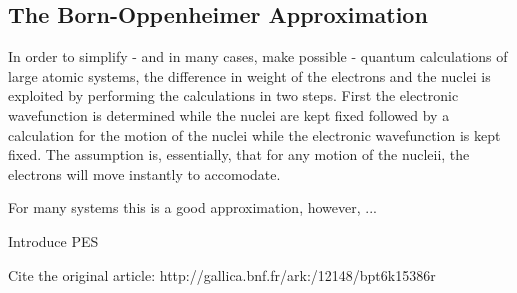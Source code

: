 \subsection{The Born-Oppenheimer Approximation}
\label{sec:born-oppenheimer}

In order to simplify - and in many cases, make possible - quantum calculations of large atomic systems, the difference in weight of the electrons and the nuclei is exploited by performing the calculations in two steps.
First the electronic wavefunction is determined while the nuclei are kept fixed followed by a calculation for the motion of the nuclei while the electronic wavefunction is kept fixed.
The assumption is, essentially, that for any motion of the nucleii, the electrons will move instantly to accomodate.

For many systems this is a good approximation, however, ...

\bit
\item Introduce PES
\item Cite the original article: http://gallica.bnf.fr/ark:/12148/bpt6k15386r
\eit

\incomplete
